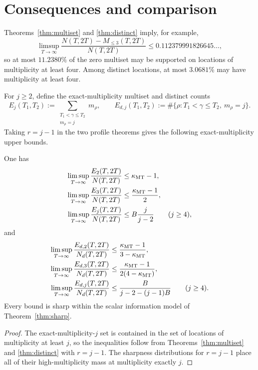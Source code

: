 \section{Consequences and comparison}

Theorems~\ref{thm:multiset} and \ref{thm:distinct} imply, for example,
\[
\limsup_{T\to\infty}
\frac{N(T,2T)-M_{\leq3}(T,2T)}{N(T,2T)}
\leq0.112379991826645\ldots,
\]
so at most $11.2380\%$ of the zero multiset may be supported on locations of multiplicity at least four.  Among distinct locations, at most $3.0681\%$ may have multiplicity at least four.

For $j\geq2$, define the exact-multiplicity multiset and distinct counts
\[
E_j(T_1,T_2):=\sum_{\substack{T_1<\gamma\leq T_2\\m_\rho=j}}m_\rho,
\qquad
E_{d,j}(T_1,T_2):=\#\{\rho:T_1<\gamma\leq T_2,\ m_\rho=j\}.
\]
Taking $r=j-1$ in the two profile theorems gives the following exact-multiplicity upper bounds.

\begin{corollary}\label{cor:exact}
One has
\begin{align*}
\limsup_{T\to\infty}\frac{E_2(T,2T)}{N(T,2T)}
&\leq \kappa_{\mathrm{MT}}-1,\\
\limsup_{T\to\infty}\frac{E_3(T,2T)}{N(T,2T)}
&\leq \frac{\kappa_{\mathrm{MT}}-1}{2},\\
\limsup_{T\to\infty}\frac{E_j(T,2T)}{N(T,2T)}
&\leq B\frac{j}{j-2}\qquad(j\geq4),
\end{align*}
and
\begin{align*}
\limsup_{T\to\infty}\frac{E_{d,2}(T,2T)}{N_d(T,2T)}
&\leq \frac{\kappa_{\mathrm{MT}}-1}{3-\kappa_{\mathrm{MT}}},\\
\limsup_{T\to\infty}\frac{E_{d,3}(T,2T)}{N_d(T,2T)}
&\leq \frac{\kappa_{\mathrm{MT}}-1}{2(4-\kappa_{\mathrm{MT}})},\\
\limsup_{T\to\infty}\frac{E_{d,j}(T,2T)}{N_d(T,2T)}
&\leq \frac{B}{j-2-(j-1)B}\qquad(j\geq4).
\end{align*}
Every bound is sharp within the scalar information model of Theorem~\ref{thm:sharp}.
\end{corollary}

\begin{proof}
The exact-multiplicity-$j$ set is contained in the set of locations of multiplicity at least $j$, so the inequalities follow from Theorems~\ref{thm:multiset} and \ref{thm:distinct} with $r=j-1$.  The sharpness distributions for $r=j-1$ place all of their high-multiplicity mass at multiplicity exactly $j$.
\end{proof}

